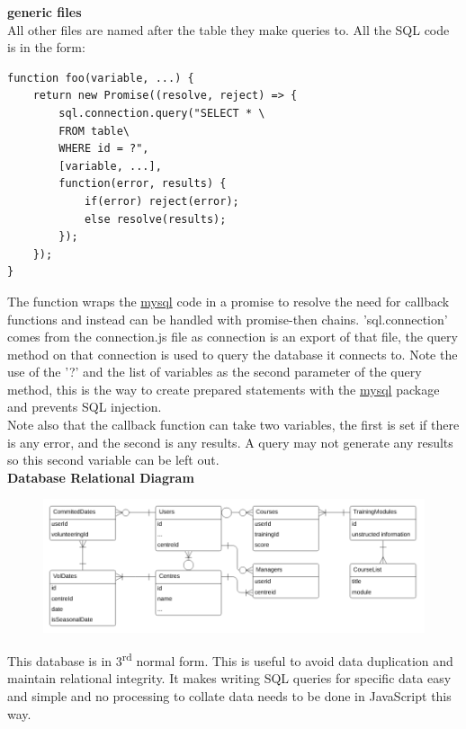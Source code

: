 \documentclass[12pt]{article}
\begin{document}
\newpage
\noindent
\textbf{generic files}\\
\noindent
All other files are named after the table they make queries to. All the SQL code is in the form:
\begin{lstlisting}
function foo(variable, ...) {
	return new Promise((resolve, reject) => {
		sql.connection.query("SELECT * \
		FROM table\
		WHERE id = ?", 
		[variable, ...], 
		function(error, results) {
			if(error) reject(error);
			else resolve(results);
		});
	});
}
\end{lstlisting}
The function wraps the \href{https://www.npmjs.com/package/mysql}{mysql} code in a promise to resolve the need for callback functions and instead can be handled with promise-then chains. 'sql.connection' comes from the connection.js file as connection is an export of that file, the query method on that connection is used to query the database it connects to. Note the use of the '?' and the list of variables as the second parameter of the query method, this is the way to create prepared statements with the \href{https://www.npmjs.com/package/mysql}{mysql} package and prevents SQL injection.\\

\noindent
Note also that the callback function can take two variables, the first is set if there is any error, and the second is any results. A query may not generate any results so this second variable can be left out.\\

\newpage
\noindent
\textbf{Database Relational Diagram}\\
\begin{figure}[H]
    \centering
    \includegraphics[width=1\textwidth]{design/database.png}
\end{figure}
\noindent
This database is in 3\textsuperscript{rd} normal form. This is useful to avoid data duplication and maintain relational integrity. It makes writing SQL queries for specific data easy and simple and no processing to collate data needs to be done in JavaScript this way.\\
\end{document}
